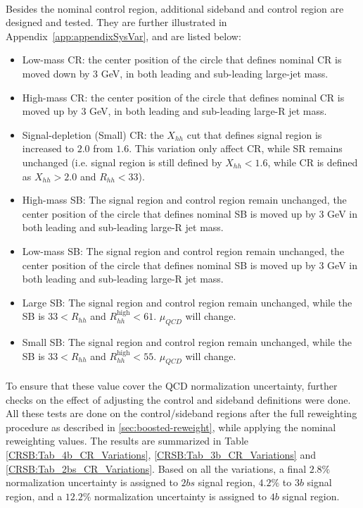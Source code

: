 \paragraph{}
Besides the nominal control region, additional sideband and control region are designed and tested. 
They are further illustrated in Appendix~\ref{app:appendixSysVar}, and are listed below:
\begin{itemize}
	\item Low-mass CR: the center position of the circle that defines nominal CR is moved down by 3 GeV, in both leading and sub-leading large-jet mass.
	\item High-mass CR: the center position of the circle that defines nominal CR is moved up by 3 GeV, in both leading and sub-leading large-R jet mass.
	\item Signal-depletion (Small) CR: the $X_{hh}$ cut that defines signal region is increased to $2.0$ from $1.6$. This variation only affect CR, while SR remains unchanged (i.e. signal region is still defined by $X_{hh}<1.6$, while CR is defined as $X_{hh}>2.0$ and $R_{hh}<33$).
	\item High-mass SB: The signal region and control region remain unchanged, the center position of the circle that defines nominal SB is moved up by 3 GeV in both leading and sub-leading large-R jet mass.
	\item Low-mass SB: The signal region and control region remain unchanged, the center position of the circle that defines nominal SB is moved up by 3 GeV in both leading and sub-leading large-R jet mass.
	\item Large SB: The signal region and control region remain unchanged, while the SB is $33 < R_{hh}$ and $ R_{hh}^{\text{high}} < 61$. $\mu_{QCD}$ will change.
	\item Small SB: The signal region and control region remain unchanged, while the SB is $33 < R_{hh}$ and $ R_{hh}^{\text{high}} < 55$. $\mu_{QCD}$ will change.
\end{itemize}

\paragraph{}
To ensure that these value cover the QCD normalization uncertainty, further checks on the effect of adjusting the control and sideband definitions were done. 
All these tests are done on the control/sideband regions after the full reweighting procedure as described in \ref{sec:boosted-reweight}, while applying the nominal reweighting values.
The results are summarized in Table \ref{CRSB:Tab_4b_CR_Variations}, \ref{CRSB:Tab_3b_CR_Variations} and \ref{CRSB:Tab_2bs_CR_Variations}. 
Based on all the variations, a final $2.8\%$ normalization uncertainty is assigned to $2bs$ signal region, $4.2\%$ to $3b$ signal region, and a $12.2\%$ normalization uncertainty is assigned to $4b$ signal region.

